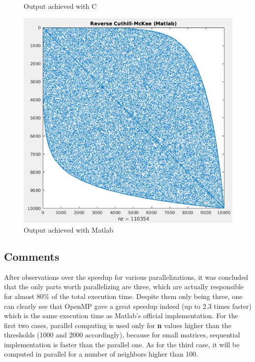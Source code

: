 \documentclass[letterpaper,12pt]{article}
\begin{document}
\begin{figure}[!htb]
\begin{minipage}[b]{0.32\textwidth}
		\caption{Output achieved with C}
		\label{fig:output_c}
	\end{minipage}
	\hfill
	\begin{minipage}[b]{0.32\textwidth}
		\includegraphics[width=\textwidth]{images/out_matlab.png}
		\caption{Output achieved with Matlab}
		\label{fig:output_matlab}
	\end{minipage}
\end{figure}

\subsection{Comments}
\vspace{2mm} %

After observations over the speedup for various parallelizations, it was concluded that the only parts worth parallelizing are three, which are actually responsible for almost 80\% of the total execution time. Despite them only being three, one can clearly see that OpenMP gave a great speedup indeed (up to 2.3 times faster) which is the same execution time as Matlab's official implementation. For the first two cases, parallel computing is used only for \textbf{n} values higher than the thresholds (1000 and 2000 accordingly),  because for small matrices, sequential implementation is faster than the parallel one. As for the third case, it will be computed in parallel for a number of neighbors higher than 100.
\end{document}
